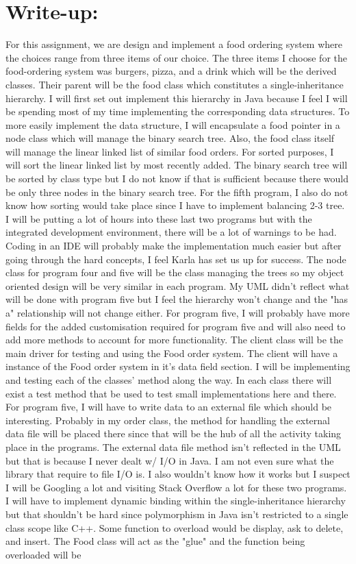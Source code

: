 \documentclass[11pt, a4paper]{article}
\begin{document}
\section*{Write-up:}
For this assignment, we are design and implement a food ordering system where the choices range from three items of our choice. The three items I choose for the food-ordering system was burgers, pizza, and a drink which will be the derived classes. Their parent will be the food class which constitutes a single-inheritance hierarchy. I will first set out implement this hierarchy in Java because I feel I will be spending most of my time implementing the corresponding data structures. To more easily implement the data structure, I will encapsulate a food pointer in a node class which will manage the binary search tree. Also, the food class itself will manage the linear linked list of similar food orders. For sorted purposes, I will sort the linear linked list by most recently added. The binary search tree will be sorted by class type but I do not know if that is sufficient because there would be only three nodes in the binary search tree. For the fifth program, I also do not know how sorting would take place since I have to implement balancing 2-3 tree. I will be putting a lot of hours into these last two programs but with the integrated development environment, there will be a lot of warnings to be had. Coding in an IDE will probably make the implementation much easier but after going through the hard concepts, I feel Karla has set us up for success. The node class for program four and five will be the class managing the trees so my object oriented design will be very similar in each program. My UML didn't reflect what will be done with program five but I feel the hierarchy won't change and the "has a" relationship will not change either. For program five, I will probably have more fields for the added customisation required for program five and will also need to add more methods to account for more functionality. The client class will be the main driver for testing and using the Food order system. The client will have a instance of the Food order system in it's data field section. I will be implementing and testing each of the classes' method along the way. In each class there will exist a test method that be used to test small implementations here and there. For program five, I will have to write data to an external file which should be interesting. Probably in my order class, the method for handling the external data file will be placed there since that will be the hub of all the activity taking place in the programs. The external data file method isn't reflected in the UML but that is because I never dealt w/ I/O in Java. I am not even sure what the library that require to file I/O is. I also wouldn't know how it works but I suspect I will be Googling a lot and visiting Stack Overflow a lot for these two programs. I will have to implement dynamic binding within the single-inheritance hierarchy but that shouldn't be hard since polymorphism in Java isn't restricted to a single class scope like C++. Some function to overload would be display, ask to delete, and insert. The Food class will act as the "glue" and the function being overloaded will be 
\end{document}

